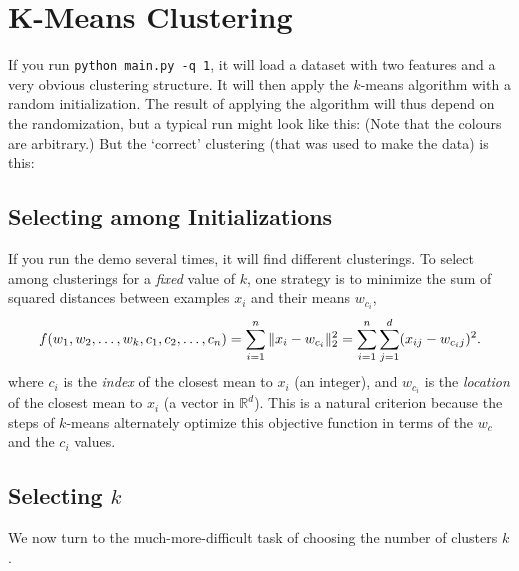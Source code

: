 \documentclass{article}
\begin{document}
\section{K-Means Clustering}

If you run \verb|python main.py -q 1|, it will load a dataset with two features and a very obvious clustering structure. It will then apply the $k$-means algorithm with a random initialization. The result of applying the algorithm will thus depend on the randomization, but a typical run might look like this:
(Note that the colours are arbitrary.) But the `correct' clustering (that was used to make the data) is this:


\subsection{Selecting among Initializations}

If you run the demo several times, it will find different clusterings. To select among clusterings for a \emph{fixed} value of $k$, one strategy is to minimize the sum of squared distances between examples $x_i$ and their means $w_{c_i}$,
\[
f(w_1,w_2,\dots,w_k,c_1,c_2,\dots,c_n) = \sum_{i=1}^n \|x_i - w_{c_i}\|_2^2 = \sum_{i=1}^n \sum_{j=1}^d (x_{ij} - w_{c_ij})^2.
\]
 where $c_i$ is the \emph{index} of the closest mean to $x_i$ (an integer), and $w_{c_i}$ is the \emph{location} of the closest mean to $x_i$ (a vector in $\mathbb{R}^d$). This is a natural criterion because the steps of $k$-means alternately optimize this objective function in terms of the $w_c$ and the $c_i$ values.




 \subsection{Selecting $k$}

 We now turn to the much-more-difficult task of choosing the number of clusters $k$.
\end{document}
